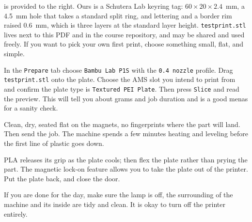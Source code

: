  is provided to the right. Ours is a Schutera Lab
keyring tag: $60 \times 20 \times 2.4$~mm, a 4.5~mm hole that takes a
standard split ring, and lettering and a border rim raised 0.6~mm, which
is three layers at the standard layer height. \texttt{testprint.stl} lives
next to this PDF and in the course repository, and may be shared and used freely.
If you want to pick your own first print, choose something small, flat, and simple.

 In the \texttt{Prepare} tab
choose \texttt{Bambu Lab P1S} with the \texttt{0.4 nozzle} profile.
 Drag \texttt{testprint.stl} onto the plate. 
Choose the AMS slot you intend
to print from and confirm the plate type is \texttt{Textured PEI Plate}.
Then press \texttt{Slice} and read the preview. This will tell you about grams and job duration
and is a good menas for a sanity check.

 Clean, dry, seated flat on the
magnets, no fingerprints where the part will land. Then send the job. The
machine spends a few minutes heating and leveling before the first line of
plastic goes down.


 PLA
releases its grip as the plate cools; then flex the plate rather than
prying the part. The magnetic lock-on feature allows you to take the plate
out of the printer. Put the plate back, and close the door.


 If you are done for
the day, make sure the lamp is off, the surrounding of the machine and its inside are tidy and clean.
It is okay to turn off the printer entirely.
